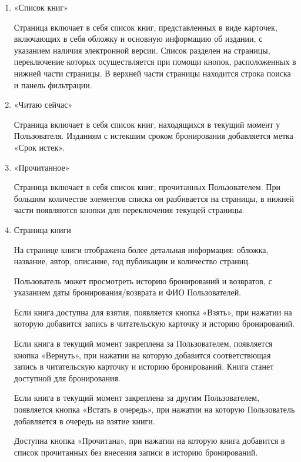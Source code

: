 \documentclass[project.tex]{subfiles}
\begin{document}
\begin{enumerate}
    \item «Список книг»\\
    \par
    Страница включает в себя список книг, представленных в виде карточек, включающих в себя обложку и основную информацию об издании, с указанием наличия электронной версии.
    Список разделен на страницы, переключение которых осуществляется при помощи кнопок, расположенных в нижней части страницы.
    В верхней части страницы находится строка поиска и панель фильтрации.
    \item «Читаю сейчас»\\
    \par
    Страница включает в себя список книг, находящихся в текущий момент у Пользователя. Изданиям с истекшим сроком бронирования добавляется метка «Срок истек».
    \item «Прочитанное»\\
    \par
    Страница включает в себя список книг, прочитанных Пользователем. При большом количестве элементов списка он разбивается на страницы, в нижней части появляются кнопки для переключения текущей страницы.
    \item Страница книги\\
    \par
    На странице книги отображена более детальная информация: обложка, название, автор, описание, год публикации и количество страниц.
    \par
    Пользователь может просмотреть историю бронирований и возвратов, с указанием даты бронирования/возврата и ФИО Пользователей.
    \par
    Если книга доступна для взятия, появляется кнопка «Взять», при нажатии на которую добавится запись в читательскую карточку и историю бронирований.
    \par
    Если книга в текущий момент закреплена за Пользователем, появляется кнопка «Вернуть», при нажатии на которую добавится соответствющая запись в читательскую карточку и историю бронирований. Книга станет доступной для бронирования.
    \par
    Если книга в текущий момент закреплена за другим Пользователем, появляется кнопка «Встать в очередь», при нажатии на которую Пользователь добавляется в очередь на взятие книги.
    \par
    Доступна кнопка «Прочитана», при нажатии на которую книга добавится в список прочитанных без внесения записи в историю бронирований.

\end{enumerate}
\end{document}
